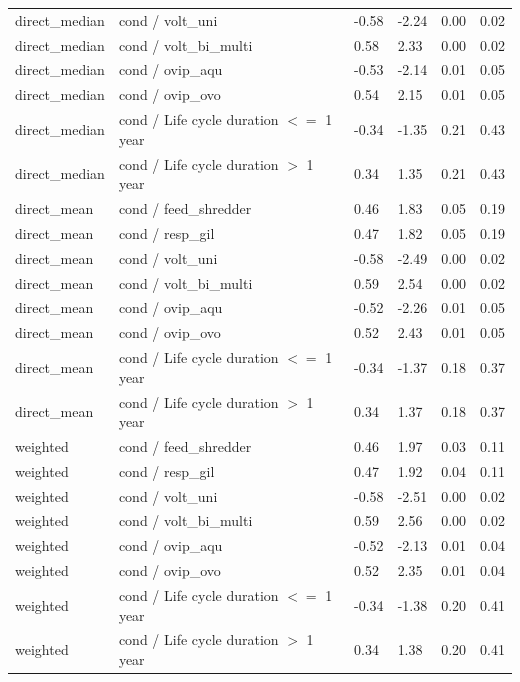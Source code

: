 \documentclass[12pt]{article}
\begin{document}
\begin{longtable}[H]{m{2.6cm}|m{7.3cm}|m{1cm}|m{1.4cm}|m{1.5cm}|m{1.5cm}}
       direct\_median & cond / volt\_uni & -0.58 & -2.24  & 0.00 & 0.02 \\ 
       direct\_median & cond / volt\_bi\_multi & 0.58 & 2.33  & 0.00 & 0.02 \\ 
       direct\_median & cond / ovip\_aqu & -0.53 & -2.14  & 0.01 & 0.05 \\ 
       direct\_median & cond / ovip\_ovo & 0.54 & 2.15  & 0.01 & 0.05 \\ 
       direct\_median & cond / Life cycle duration $<=$ 1 year & -0.34 & -1.35  & 0.21 & 0.43 \\ 
       direct\_median & cond / Life cycle duration $>$ 1 year & 0.34 & 1.35  & 0.21 & 0.43 \\ 
       direct\_mean & cond / feed\_shredder & 0.46 & 1.83  & 0.05 & 0.19 \\ 
       direct\_mean & cond / resp\_gil & 0.47 & 1.82  & 0.05 & 0.19 \\ 
       direct\_mean & cond / volt\_uni & -0.58 & -2.49  & 0.00 & 0.02 \\ 
       direct\_mean & cond / volt\_bi\_multi & 0.59 & 2.54  & 0.00 & 0.02 \\ 
       direct\_mean & cond / ovip\_aqu & -0.52 & -2.26  & 0.01 & 0.05 \\ 
       direct\_mean & cond / ovip\_ovo & 0.52 & 2.43  & 0.01 & 0.05 \\ 
       direct\_mean & cond / Life cycle duration $<=$ 1 year & -0.34 & -1.37  & 0.18 & 0.37 \\ 
       direct\_mean & cond / Life cycle duration $>$ 1 year & 0.34 & 1.37  & 0.18 & 0.37 \\ 
       weighted & cond / feed\_shredder & 0.46 & 1.97  & 0.03 & 0.11 \\ 
       weighted & cond / resp\_gil & 0.47 & 1.92  & 0.04 & 0.11 \\ 
       weighted & cond / volt\_uni & -0.58 & -2.51  & 0.00 & 0.02 \\ 
       weighted & cond / volt\_bi\_multi & 0.59 & 2.56  & 0.00 & 0.02 \\ 
       weighted & cond / ovip\_aqu & -0.52 & -2.13  & 0.01 & 0.04 \\ 
       weighted & cond / ovip\_ovo & 0.52 & 2.35  & 0.01 & 0.04 \\ 
       weighted & cond / Life cycle duration $<=$ 1 year & -0.34 & -1.38  & 0.20 & 0.41 \\ 
       weighted & cond / Life cycle duration $>$ 1 year & 0.34 & 1.38  & 0.20 & 0.41 \\ 

\end{longtable}
\end{document}
